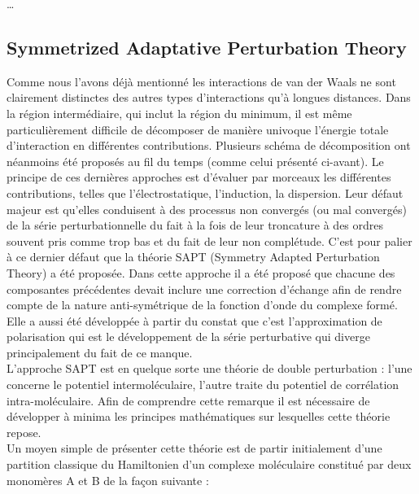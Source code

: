 \ldots




\subsection[SAPT]{Symmetrized Adaptative Perturbation Theory}

   
Comme nous l’avons déjà mentionné les interactions de van der Waals ne sont clairement distinctes des autres types d’interactions qu’à longues distances. Dans la région intermédiaire, qui inclut la région du minimum, il est même particulièrement difficile de décomposer de manière univoque l’énergie totale d’interaction en différentes contributions. Plusieurs schéma de décomposition ont néanmoins été proposés au fil du temps (comme celui présenté ci-avant). Le principe de ces dernières approches est d’évaluer par morceaux les différentes contributions, telles que l’électrostatique, l’induction, la dispersion. Leur défaut majeur est qu’elles conduisent à des processus non convergés (ou mal convergés) de la série perturbationnelle du fait à la fois de leur troncature à des ordres souvent pris comme trop bas  et du fait de leur non complétude. C’est pour palier à ce dernier défaut que la théorie SAPT (Symmetry Adapted Perturbation Theory) a été proposée. Dans cette approche il a été proposé que chacune des composantes précédentes devait inclure une correction d’échange afin de rendre compte de la nature anti-symétrique de la fonction d’onde du complexe formé. Elle a aussi été développée à partir du constat que c’est l’approximation de polarisation qui est le développement de la série perturbative qui diverge principalement du fait de ce manque.\\
   
L’approche SAPT est en quelque sorte une théorie de double perturbation : l’une concerne le potentiel intermoléculaire, l’autre traite du potentiel de corrélation intra-moléculaire.  Afin de comprendre cette remarque il est nécessaire de développer à minima les principes mathématiques sur lesquelles cette théorie repose.\\
   
Un moyen simple de présenter cette théorie est de partir initialement d’une partition classique du Hamiltonien d'un complexe moléculaire constitué par deux monomères A et B de la façon suivante :
   
